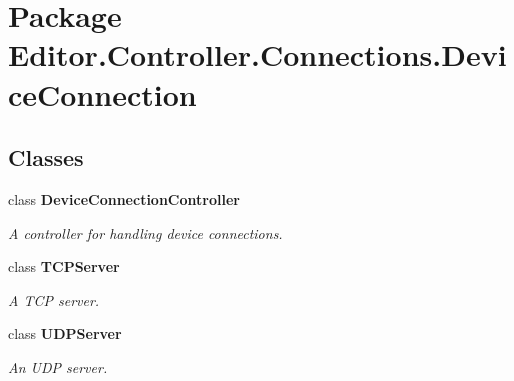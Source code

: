 \section{Package Editor.\-Controller.\-Connections.\-Device\-Connection}
\label{namespace_editor_1_1_controller_1_1_connections_1_1_device_connection}
\subsection*{Classes}
\begin{DoxyCompactItemize}
\item 
class {\bf Device\-Connection\-Controller}
\begin{DoxyCompactList}\small\item\em A controller for handling device connections. \end{DoxyCompactList}\item 
class {\bf T\-C\-P\-Server}
\begin{DoxyCompactList}\small\item\em A T\-C\-P server. \end{DoxyCompactList}\item 
class {\bf U\-D\-P\-Server}
\begin{DoxyCompactList}\small\item\em An U\-D\-P server. \end{DoxyCompactList}\end{DoxyCompactItemize}
